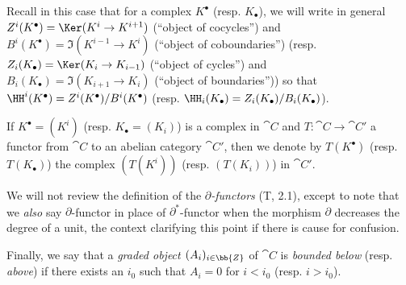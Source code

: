 \begin{env}[11.2.1]
Recall in this case that for a complex $K^\bullet$ (resp. $K_\bullet$), we will write in general $Z^i(K^\bullet)=\Ker(K^i\to K^{i+1})$ (``object of cocycles'') and $B^i(K^\bullet)=\Im(K^{i-1}\to K^i)$ (``object of coboundaries'') (resp. $Z_i(K_\bullet)=\Ker(K_i\to K_{i-1})$ (``object of cycles'') and $B_i(K_\bullet)=\Im(K_{i+1}\to K_i)$ (``object of boundaries'')) so that $\HH^i(K^\bullet)=Z^i(K^\bullet)/B^i(K^\bullet)$ (resp. $\HH_i(K_\bullet)=Z_i(K_\bullet)/B_i(K_\bullet)$).

If $K^\bullet=(K^i)$ (resp. $K_\bullet=(K_i)$) is a complex in $\cat{C}$ and $T:\cat{C}\to\cat{C}'$ a functor from $\cat{C}$ to an abelian category $\cat{C}'$, then we denote by $T(K^\bullet)$ (resp. $T(K_\bullet)$) the complex $(T(K^i))$ (resp. $(T(K_i))$) in $\cat{C}'$.

We will not review the definition of the \emph{$\partial$-functors} (T, 2.1), except to note that we \emph{also} say $\partial$-functor in place of $\partial^*$-functor when the morphism $\partial$ decreases the degree of a unit, the context clarifying this point if there is cause for confusion.

Finally, we say that a \emph{graded object $(A_i)_{i\in\bb{Z}}$} of $\cat{C}$ is \emph{bounded below} (resp. \emph{above}) if there exists an $i_0$ such that $A_i=0$ for $i<i_0$ (resp. $i>i_0$).
\end{env}

